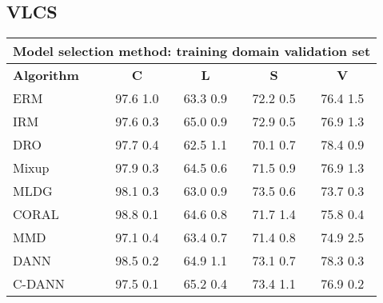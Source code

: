 \documentclass{article}
\begin{document}
\subsection{VLCS}
\begin{center}
\begin{tabular}{lcccc}
\toprule
\multicolumn{5}{c}{\textbf{Model selection method: training domain validation set}} \\
\midrule
\textbf{Algorithm}    & \textbf{C}                & \textbf{L}                & \textbf{S}                & \textbf{V}                \\
\midrule
ERM                       & 97.6  1.0            & 63.3  0.9            & 72.2  0.5            & 76.4  1.5            \\
IRM                       & 97.6  0.3            & 65.0  0.9            & 72.9  0.5            & 76.9  1.3            \\
DRO                 & 97.7  0.4            & 62.5  1.1            & 70.1  0.7            & 78.4  0.9            \\
Mixup                     & 97.9  0.3            & 64.5  0.6            & 71.5  0.9            & 76.9  1.3            \\
MLDG                      & 98.1  0.3            & 63.0  0.9            & 73.5  0.6            & 73.7  0.3            \\
CORAL                     & 98.8  0.1            & 64.6  0.8            & 71.7  1.4            & 75.8  0.4            \\
MMD                       & 97.1  0.4            & 63.4  0.7            & 71.4  0.8            & 74.9  2.5            \\
DANN                       & 98.5  0.2            & 64.9  1.1            & 73.1  0.7            & 78.3  0.3            \\
C-DANN                   & 97.5  0.1            & 65.2  0.4            & 73.4  1.1            & 76.9  0.2            \\
\bottomrule
\end{tabular}
\end{center}
\end{document}
